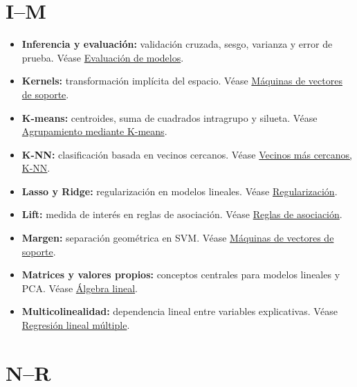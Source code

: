 \documentclass[
  spanish,
  10.5pt,
  letterpaper,
  DIV=11,
  numbers=noendperiod,
  oneside,
  open=any]{scrreprt}
\providecommand{\tightlist}{%
  \setlength{\itemsep}{0pt}\setlength{\parskip}{0pt}}
\theoremstyle{definition}
\theoremstyle{definition}
\theoremstyle{plain}
\theoremstyle{remark}
\begin{document}
\section*{I--M}\label{im}


\begin{itemize}
\tightlist
\item
  \textbf{Inferencia y evaluación:} validación cruzada, sesgo, varianza
  y error de prueba. Véase \hyperref[sec-evaluacion-modelos]{Evaluación
  de modelos}.
\item
  \textbf{Kernels:} transformación implícita del espacio. Véase
  \hyperref[sec-svm]{Máquinas de vectores de soporte}.
\item
  \textbf{K-means:} centroides, suma de cuadrados intragrupo y silueta.
  Véase \hyperref[sec-kmeans]{Agrupamiento mediante K-means}.
\item
  \textbf{K-NN:} clasificación basada en vecinos cercanos. Véase
  \hyperref[sec-knn]{Vecinos más cercanos, K-NN}.
\item
  \textbf{Lasso y Ridge:} regularización en modelos lineales. Véase
  \hyperref[sec-regularizacion]{Regularización}.
\item
  \textbf{Lift:} medida de interés en reglas de asociación. Véase
  \hyperref[sec-reglas-asociacion]{Reglas de asociación}.
\item
  \textbf{Margen:} separación geométrica en SVM. Véase
  \hyperref[sec-svm]{Máquinas de vectores de soporte}.
\item
  \textbf{Matrices y valores propios:} conceptos centrales para modelos
  lineales y PCA. Véase \hyperref[sec-algebra-lineal]{Álgebra lineal}.
\item
  \textbf{Multicolinealidad:} dependencia lineal entre variables
  explicativas. Véase \hyperref[sec-regresion-lineal-multiple]{Regresión
  lineal múltiple}.
\end{itemize}

\section*{N--R}\label{nr}

\end{document}
